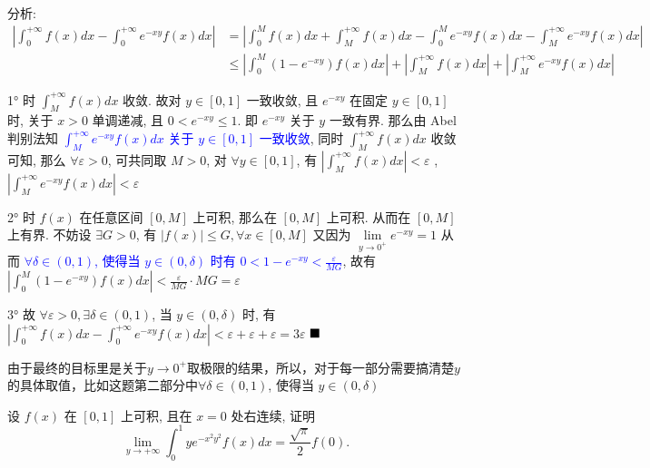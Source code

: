 \documentclass[lang=cn,newtx,10pt,scheme=chinese]{elegantbook}
\begin{document}
\begin{solution}
分析:
\begin{align*}
|\int_{0}^{+\infty} f(x) dx - \int_{0}^{+\infty} e^{-xy} f(x) dx| &= |\int_{0}^{M} f(x) dx + \int_{M}^{+\infty} f(x) dx - \int_{0}^{M} e^{-xy} f(x) dx - \int_{M}^{+\infty} e^{-xy} f(x) dx|\\
&\le |\int_{0}^{M} (1 - e^{-xy}) f(x) dx| + |\int_{M}^{+\infty} f(x) dx| + |\int_{M}^{+\infty} e^{-xy} f(x) dx|
\end{align*}

1° 时 $\int_{M}^{+\infty} f(x) dx$ 收敛. 故对 $y \in [0, 1]$ 一致收敛, 且 $e^{-xy}$ 在固定 $y \in [0, 1]$ 时, 关于 $x > 0$ 单调递减, 且 $0 < e^{-xy} \le 1$. 即 $e^{-xy}$ 关于 $y$ 一致有界. 那么由 Abel 判别法知\textcolor{blue}{ $\int_{M}^{+\infty} e^{-xy} f(x) dx$ 关于 $y \in [0, 1]$ 一致收敛}, 同时 $\int_{M}^{+\infty} f(x) dx$ 收敛可知, 那么 $\forall \varepsilon > 0$, 可共同取 $M > 0$, 对 $\forall y \in [0, 1]$, 有 $|\int_{M}^{+\infty} f(x) dx| < \varepsilon$ , $|\int_{M}^{+\infty} e^{-xy} f(x) dx| < \varepsilon$

2° 时 $f(x)$ 在任意区间 $[0, M]$ 上可积, 那么在 $[0, M]$ 上可积. 从而在 $[0, M]$ 上有界. 不妨设 $\exists G > 0$, 有 $|f(x)| \le G, \forall x \in [0, M]$
又因为 $\lim\limits_{y \to 0^+} e^{-xy} = 1$ 从而 \textcolor{blue}{$\forall \delta \in (0, 1)$, 使得当 $y \in (0, \delta)$ 时有 $0 < 1 - e^{-xy} < \frac{\varepsilon}{MG}$}, 故有 $|\int_{0}^{M} (1 - e^{-xy}) f(x) dx| < \frac{\varepsilon}{MG} \cdot MG = \varepsilon$

3° 故 $\forall \varepsilon > 0, \exists \delta \in (0, 1)$, 当 $y \in (0, \delta)$ 时, 有
$|\int_{0}^{+\infty} f(x) dx - \int_{0}^{+\infty} e^{-xy} f(x) dx| < \varepsilon + \varepsilon + \varepsilon = 3\varepsilon$
$\hfill \blacksquare$
\end{solution}
\begin{remark}
由于最终的目标里是关于$y \to 0^{+}$取极限的结果，所以，对于每一部分需要搞清楚$y$的具体取值，比如这题第二部分中$\forall \delta \in (0, 1)$, 使得当 $y \in (0, \delta)$
\end{remark}

\begin{example}
设 $f(x)$ 在 $[0, 1]$ 上可积, 且在 $x=0$ 处右连续, 证明
$$ \lim\limits_{y \to +\infty} \int_{0}^{1} y e^{-x^2 y^2} f(x) dx = \frac{\sqrt{\pi}}{2} f(0). $$
\end{example}
\end{document}
